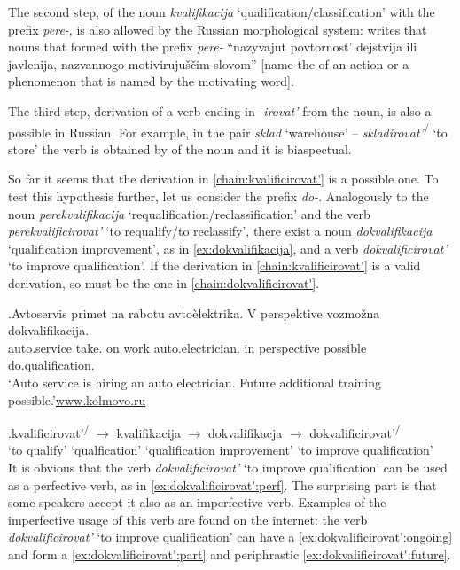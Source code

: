 The second step,  of the noun \textit{kvalifikacija} `qualification\slash classifica\-tion' with the prefix \textit{pere-}, is also allowed by the Russian morphological system: \citet[226]{Shvedova:82} writes that nouns that formed with the prefix \textit{pere-} ``nazyvajut povtornost' dejstvija ili javlenija, nazvannogo motiviruju\v{s}\v{c}im slovom'' [name the  of an action or a phenomenon that is named by the motivating word].

The third step, derivation of a verb ending in \textit{-irovat'} from the noun, is also a possible  in Russian. For example, in the pair \textit{sklad} `warehouse' -- \textit{skladirovat'}\textsuperscript{\PF\slash\IPF} `to store' the verb is obtained by  of the noun and it is biaspectual.

So far it seems that the derivation in \ref{chain:kvalificirovat'} is a possible one. To test this hypothesis further, let us consider the  prefix \textit{do-}. Analogously to the noun \textit{perekvalifikacija} `requalification/reclassification' and the verb \textit{perekvalificirovat'} `to requalify/to reclassify', there exist a noun \textit{dokvalifikacija} `qualification improvement', as in \ref{ex:dokvalifikacija}, and a verb \textit{dokvalificirovat'} `to improve qualification'. If the derivation in \ref{chain:kvalificirovat'} is a valid derivation, so must be the one in \ref{chain:dokvalificirovat'}.

\exg.\label{ex:dokvalifikacija}Avtoservis primet na rabotu avto\`{e}lektrika. V perspektive vozmo\v{z}na dokvalifikacija.\\
{auto.service} take. on work {auto.electrician.} in perspective possible do.qualification.\\
\trans `Auto service is hiring an auto electrician. Future additional training possible.'\hbox{}\hfill\hbox{\url{www.kolmovo.ru}}

\exg.\label{chain:dokvalificirovat'}kvalificirovat'\textsuperscript{\PF\slash\IPF} {$\rightarrow$} kvalifikacija {$\rightarrow$} dokvalifikacja {$\rightarrow$} dokvalificirovat'\textsuperscript{\PF\slash\IPF}\\
{`to qualify'} {} {`qualfication'} {} {`qualification improvement'} {} {`to improve qualification'}\\

It is obvious that the verb \textit{dokvalificirovat'} `to improve qualification' can be used as a perfective verb, as in \ref{ex:dokvalificirovat':perf}. The surprising part is that some speakers accept it also as an imperfective verb. Examples of the imperfective usage of this verb are found on the internet: the verb \textit{dokvalificirovat'} `to improve qualification' can have a  \ref{ex:dokvalificirovat':ongoing} and form a  \ref{ex:dokvalificirovat':part} and periphrastic  \ref{ex:dokvalificirovat':future}. 

